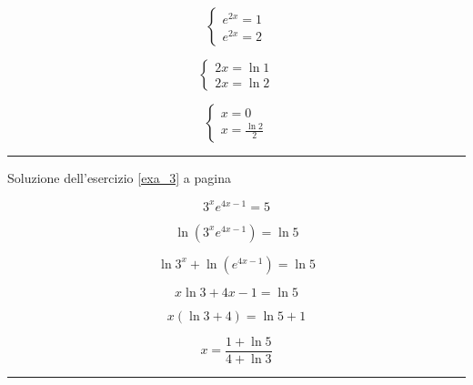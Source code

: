 \begin{equation*}
\left\{
\begin{array}{ll}
e^{2x}=1 \\
e^{2x}=2
\end{array}
\right.
\end{equation*}

\begin{equation*}
\left\{
\begin{array}{ll}
2x=\ln1 \\
2x=\ln2
\end{array}
\right.
\end{equation*}

\begin{equation*}
\left\{
\begin{array}{ll}
x=0 \\
x=\frac{\ln2}{2}
\end{array}
\right.
\end{equation*}



\vspace{1cm}
\hrule
\vspace{1cm}

Soluzione dell'esercizio \ref{exa_3} a pagina \pageref{exa_3}\label{sola_3}


\begin{equation*}
3^xe^{4x-1} = 5
\end{equation*}

\begin{equation*}
\ln ( 3^xe^{4x - 1} ) = \ln 5
\end{equation*}

\begin{equation*}
\ln 3^x + \ln ( e^{4x - 1} ) = \ln 5
\end{equation*}

\begin{equation*}
x\ln 3+4x-1=\ln 5
\end{equation*}

\begin{equation*}
x(\ln3 +4)=\ln 5 +1
\end{equation*}

\begin{equation*}
x=\frac{
1+\ln 5
}{
4+\ln 3
}
\end{equation*}

\vspace{1cm}
\hrule
\vspace{1cm}


